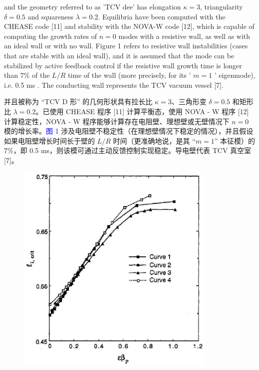 \documentclass[utf8]{ctexart}
\newcommand\enzhbox[2]{
  	\quad\par \begin{paracol}{2} \colseprulecolor{black} 
  		\begin{spacing}{1.0}
  			\footnotesize  #1
  		\end{spacing}
  		\switchcolumn[1] 
  		#2
  	\end{paracol} \quad\par
  }
\begin{document}
\begin{sloppypar}
  
 
\enzhbox{  \noindent and the geometry referred to as 'TCV dee' has elongation $\kappa=3$, triangularity $\delta=0.5$ and squareness $\lambda=0.2$. Equilibria have been computed with the CHEASE code \textcolor{green!50!black}{[11]} and stability with the NOVA-W code \textcolor{green!50!black}{[12]}, which is capable of computing the growth rates of $n=0$ modes with a resistive wall, as well as with an ideal wall or with no wall. Figure 1 refers to resistive wall instabilities (cases that are stable with an ideal wall), and it is assumed that the mode can be stabilized by active feedback control if the resistive wall growth time is longer than $7 \%$ of the $L / R$ time of the wall (more precisely, for its ' $m=1$ ' eigenmode), i.e. 0.5 ms . The conducting wall represents the TCV vacuum vessel \textcolor{green!50!black}{[7]}.}{
\noindent 并且被称为 “TCV D 形” 的几何形状具有拉长比 $\kappa = 3$、三角形变 $\delta = 0.5$ 和矩形比 $\lambda = 0.2$。已使用 CHEASE 程序 \textcolor{green!50!black}{[11]} 计算平衡态，使用 NOVA - W 程序 \textcolor{green!50!black}{[12]} 计算稳定性，NOVA - W 程序能够计算存在电阻壁、理想壁或无壁情况下 $n = 0$ 模的增长率。\textcolor{blue}{图 1} 涉及电阻壁不稳定性（在理想壁情况下稳定的情况），并且假设如果电阻壁增长时间长于壁的 $L / R$ 时间（更准确地说，是其 “$m = 1$” 本征模）的 7\%，即 0.5 ms，则该模可通过主动反馈控制实现稳定。导电壁代表 TCV 真空室 \textcolor{green!50!black}{[7]}。 }
  \begin{figure}[H]
  	\centering
  	\includegraphics[max width=0.85\textwidth,max height=0.3\textheight]{2025_01_10_a0135324997886412d98g-3}

\end{figure}
\end{sloppypar}
\end{document}
